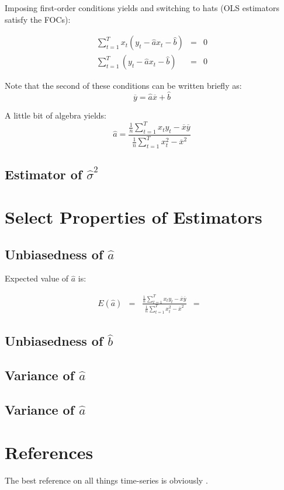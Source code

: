 \documentclass[12pt]{article}
\begin{document}
Imposing first-order conditions yields and switching to hats (OLS estimators satisfy the FOCs):

\begin{eqnarray}
\sum_{t=1}^{T}x_t (y_t - \hat{a} x_t - \hat{b}) &=&  0 \\
\sum_{t=1}^{T} (y_t - \hat{a} x_t - \hat{b}) &=& 0
\end{eqnarray}

Note that the second of these conditions can be written briefly as:
\begin{equation}
\overline{y} = \hat{a} \overline{x} + \hat{b}
\end{equation}

A little bit of algebra yields:
\begin{equation}
\hat{a} = \frac{\frac{1}{n}\sum\limits_{t=1}^{T}x_t y_t - \overline{x} \overline{y}}
{\frac{1}{n}\sum\limits_{t=1}^{T}x_t^2 - \overline{x}^2}
\end{equation}

\subsection{Estimator of $\hat{\sigma}^2$}


\section{Select Properties of Estimators}

\subsection{Unbiasedness of $\hat{a}$}
Expected value of $\hat{a}$ is:

\begin{eqnarray}
E(\hat{a}) &=& \frac{\frac{1}{n}\sum\limits_{t=1}^{T}x_t y_t - \overline{x} \overline{y}}{\frac{1}{n}\sum\limits_{t=1}^{T}x_t^2 - \overline{x}^2}
&=& 
\end{eqnarray}

\subsection{Unbiasedness of $\hat{b}$}

\subsection{Variance of $\hat{a}$}
\subsection{Variance of $\hat{a}$}


\section{References}
The best reference on all things time-series is obviously \cite{hamilton_tsa}. 




\end{document}
